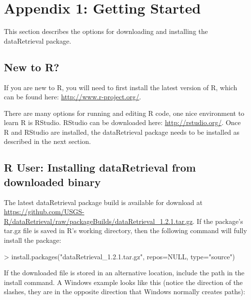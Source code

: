 \documentclass[a4paper,11pt]{article}
\begin{document}
\newpage
\appendix
\section{Appendix 1: Getting Started}
\label{sec:appendix1}
This section describes the options for downloading and installing the dataRetrieval package.

\subsection{New to R?}
If you are new to R, you will need to first install the latest version of R, which can be found here: \url{http://www.r-project.org/}.

There are many options for running and editing R code, one nice environment to learn R is RStudio. RStudio can be downloaded here: \url{http://rstudio.org/}. Once R and RStudio are installed, the dataRetrieval package needs to be installed as described in the next section.

\subsection{R User: Installing dataRetrieval from downloaded binary}
The latest dataRetrieval package build is available for download at \url{https://github.com/USGS-R/dataRetrieval/raw/packageBuilds/dataRetrieval_1.2.1.tar.gz}.  If the package's tar.gz file is saved in R's working directory, then the following command will fully install the package:

\begin{Schunk}
\begin{Sinput}
> install.packages("dataRetrieval_1.2.1.tar.gz", 
                  repos=NULL, type="source")
\end{Sinput}
\end{Schunk}

If the downloaded file is stored in an alternative location, include the path in the install command.  A Windows example looks like this (notice the direction of the slashes, they are in the opposite direction that Windows normally creates paths):
\end{document}
